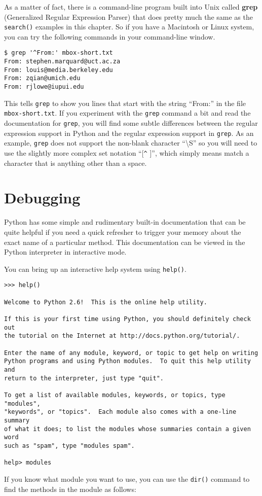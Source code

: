 As a matter of fact, there is a command-line program built into Unix
called {\bf grep} (Generalized Regular Expression Parser) that does pretty much
the same as the {\tt search()} examples in this chapter.  So if you have a
Macintosh or Linux system, you can try the following commands in your command-line window.

\beforeverb
\begin{verbatim}
$ grep '^From:' mbox-short.txt
From: stephen.marquard@uct.ac.za
From: louis@media.berkeley.edu
From: zqian@umich.edu
From: rjlowe@iupui.edu
\end{verbatim}
\afterverb
%
This tells {\tt grep} to show you lines that start with the string ``From:'' in the file
{\tt mbox-short.txt}.   If you experiment with the {\tt grep} command a bit and read the
documentation for {\tt grep}, you will find some subtle differences between the regular
expression support in Python and the regular expression support in {\tt grep}.  As an example,
{\tt grep} does not support the non-blank character ``{\textbackslash}S'' so you will need to
use the slightly more complex set notation ``[\verb"^" ]'', which simply means match a
character that is anything other than a space.

\section{Debugging}

Python has some simple and rudimentary built-in documentation that can be quite helpful if
you need a quick refresher to trigger your memory about the exact name of a particular method.
This documentation can be viewed in the Python interpreter in interactive mode.

You can bring up an interactive help system using {\tt help()}.

\beforeverb
\begin{verbatim}
>>> help()

Welcome to Python 2.6!  This is the online help utility.

If this is your first time using Python, you should definitely check out
the tutorial on the Internet at http://docs.python.org/tutorial/.

Enter the name of any module, keyword, or topic to get help on writing
Python programs and using Python modules.  To quit this help utility and
return to the interpreter, just type "quit".

To get a list of available modules, keywords, or topics, type "modules",
"keywords", or "topics".  Each module also comes with a one-line summary
of what it does; to list the modules whose summaries contain a given word
such as "spam", type "modules spam".

help> modules
\end{verbatim}
\afterverb
%
If you know what module you want to use, you can use the {\tt dir()} command to find the methods in the module as follows:


